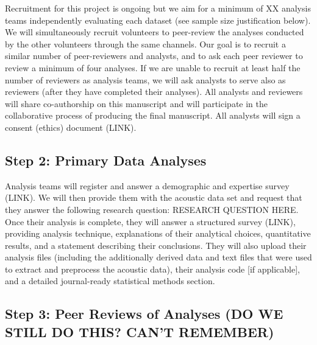 \documentclass[
  english,
  man]{apa6}
\begin{document}
Recruitment for this project is ongoing but we aim for a minimum of XX analysis teams independently evaluating each dataset (see sample size justification below).
We will simultaneously recruit volunteers to peer-review the analyses conducted by the other volunteers through the same channels.
Our goal is to recruit a similar number of peer-reviewers and analysts, and to ask each peer reviewer to review a minimum of four analyses.
If we are unable to recruit at least half the number of reviewers as analysis teams, we will ask analysts to serve also as reviewers (after they have completed their analyses).
All analysts and reviewers will share co-authorship on this manuscript and will participate in the collaborative process of producing the final manuscript.
All analysts will sign a consent (ethics) document (LINK).

\hypertarget{step-2-primary-data-analyses}{%
\subsection{Step 2: Primary Data Analyses}\label{step-2-primary-data-analyses}}

Analysis teams will register and answer a demographic and expertise survey (LINK).
We will then provide them with the acoustic data set and request that they answer the following research question: RESEARCH QUESTION HERE.
Once their analysis is complete, they will answer a structured survey (LINK), providing analysis technique, explanations of their analytical choices, quantitative results, and a statement describing their conclusions.
They will also upload their analysis files (including the additionally derived data and text files that were used to extract and preprocess the acoustic data), their analysis code {[}if applicable{]}, and a detailed journal-ready statistical methods section.

\hypertarget{step-3-peer-reviews-of-analyses-do-we-still-do-this-cant-remember}{%
\subsection{Step 3: Peer Reviews of Analyses (DO WE STILL DO THIS? CAN'T REMEMBER)}\label{step-3-peer-reviews-of-analyses-do-we-still-do-this-cant-remember}}
\end{document}
